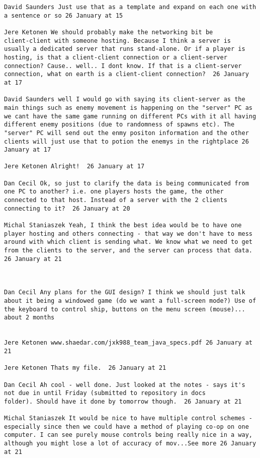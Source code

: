 \begin{verbatim}
David Saunders Just use that as a template and expand on each one with
a sentence or so 26 January at 15

Jere Ketonen We should probably make the networking bit be
client-client with someone hosting. Because I think a server is
usually a dedicated server that runs stand-alone. Or if a player is
hosting, is that a client-client connection or a client-server
connection? Cause.. well.. I dont know. If that is a client-server
connection, what on earth is a client-client connection?  26 January
at 17

David Saunders well I would go with saying its client-server as the
main things such as enemy movement is happening on the "server" PC as
we cant have the same game running on different PCs with it all having
different enemy positions (due to randomness of spawns etc). The
"server" PC will send out the enmy positon information and the other
clients will just use that to potion the enemys in the rightplace 26
January at 17

Jere Ketonen Alright!  26 January at 17

Dan Cecil Ok, so just to clarify the data is being communicated from
one PC to another? i.e. one players hosts the game, the other
connected to that host. Instead of a server with the 2 clients
connecting to it?  26 January at 20

Michal Staniaszek Yeah, I think the best idea would be to have one
player hosting and others connecting - that way we don't have to mess
around with which client is sending what. We know what we need to get
from the clients to the server, and the server can process that data.
26 January at 21



Dan Cecil Any plans for the GUI design? I think we should just talk
about it being a windowed game (do we want a full-screen mode?) Use of
the keyboard to control ship, buttons on the menu screen (mouse)...
about 2 months 
 

Jere Ketonen www.shaedar.com/jxk988_team_java_specs.pdf 26 January at 21

Jere Ketonen Thats my file.  26 January at 21

Dan Cecil Ah cool - well done. Just looked at the notes - says it's
not due in until Friday (submitted to repository in docs
folder). Should have it done by tomorrow though.  26 January at 21

Michal Staniaszek It would be nice to have multiple control schemes -
especially since then we could have a method of playing co-op on one
computer. I can see purely mouse controls being really nice in a way,
although you might lose a lot of accuracy of mov...See more 26 January
at 21


\end{verbatim}
